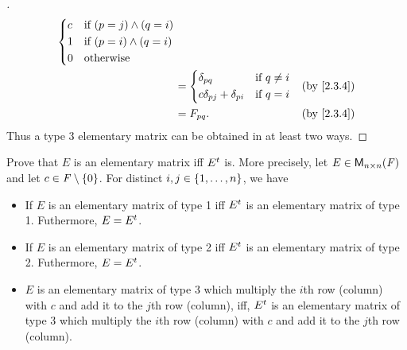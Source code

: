 \begin{proof}[]
\begin{align*}
\begin{dcases}
			                                                c & \text{if } (p = j) \land (q = i)    \\
			                                                1 & \text{if } (p = i) \land (q = i)    \\
			                                                0 & \text{otherwise}
		                                                \end{dcases}                              \\
		                                            & = \begin{dcases}
			                                                \delta_{p q}                  & \text{if } q \neq i \\
			                                                c \delta_{p j} + \delta_{p i} & \text{if } q = i
		                                                \end{dcases} &  & \by{2.3.4}                  \\
		                                            & = F_{p q}.                                             &  & \by{2.3.4}
	\end{align*}
	Thus a type 3 elementary matrix can be obtained in at least two ways.
\end{proof}

\begin{ex}\label{ex:3.1.5}
	Prove that \(E\) is an elementary matrix iff \({E}^{t}\) is.
	More precisely, let \(E \in \ms[n][n][\F]\) and let \(c \in \mathit{F} \setminus \left\lbrace0\right\rbrace\).
	For distinct \(i, j \in \left\lbrace1, \dots, n\right\rbrace\), we have
	\begin{itemize}
		\item If \(E\) is an elementary matrix of type 1 iff \({E}^{t}\) is an elementary matrix of type 1.
		      Futhermore, \(E = {E}^{t}\).
		\item If \(E\) is an elementary matrix of type 2 iff \({E}^{t}\) is an elementary matrix of type 2.
		      Futhermore, \(E = {E}^{t}\).
		\item \(E\) is an elementary matrix of type 3 which multiply the \(i\)th row (column) with \(c\) and add it to the \(j\)th row (column), iff, \({E}^{t}\) is an elementary matrix of type 3 which multiply the \(i\)th row (column) with \(c\) and add it to the \(j\)th row (column).
	\end{itemize}
\end{ex}


